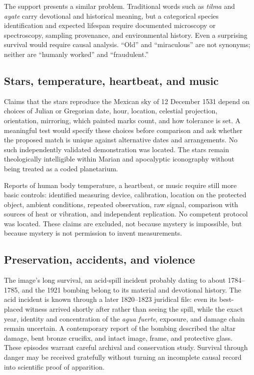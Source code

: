 The support presents a similar problem. Traditional words such as \emph{tilma} and \emph{ayate} carry devotional and historical meaning, but a categorical species identification and expected lifespan require documented microscopy or spectroscopy, sampling provenance, and environmental history. Even a surprising survival would require causal analysis. “Old” and “miraculous” are not synonyms; neither are “humanly worked” and “fraudulent.”

\subsection{Stars, temperature, heartbeat, and music}

Claims that the stars reproduce the Mexican sky of 12 December 1531 depend on choices of Julian or Gregorian date, hour, location, celestial projection, orientation, mirroring, which painted marks count, and how tolerance is set. A meaningful test would specify these choices before comparison and ask whether the proposed match is unique against alternative dates and arrangements. No such independently validated demonstration was located. The stars remain theologically intelligible within Marian and apocalyptic iconography without being treated as a coded planetarium.

Reports of human body temperature, a heartbeat, or music require still more basic controls: identified measuring device, calibration, location on the protected object, ambient conditions, repeated observation, raw signal, comparison with sources of heat or vibration, and independent replication. No competent protocol was located. These claims are excluded, not because mystery is impossible, but because mystery is not permission to invent measurements.

\subsection{Preservation, accidents, and violence}

The image's long survival, an acid-spill incident probably dating to about 1784--1785, and the 1921 bombing belong to its material and devotional history. The acid incident is known through a later 1820--1823 juridical file: even its best-placed witness arrived shortly after rather than seeing the spill, while the exact year, identity and concentration of the \emph{agua fuerte}, exposure, and damage chain remain uncertain. A contemporary report of the bombing described the altar damage, bent bronze crucifix, and intact image, frame, and protective glass. These episodes warrant careful archival and conservation study. Survival through danger may be received gratefully without turning an incomplete causal record into scientific proof of apparition.

